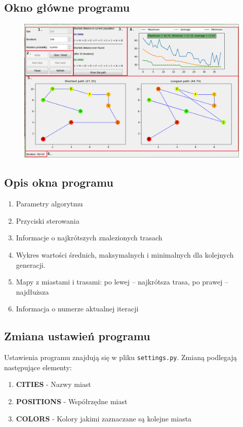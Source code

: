 \documentclass[a4paper,11pt]{article}
\begin{document}
		\subsection{Okno główne programu}
			\begin{figure}[H]
				\centering
				\includegraphics[scale=0.55]{main_window2.png}
			\end{figure}
		
		\subsection{Opis okna programu}
			\begin{enumerate}
				\item Parametry algorytmu
				\item Przyciski sterowania
				\item Informacje o najkrótszych znalezionych trasach
				\item Wykres wartości średnich, maksymalnych i minimalnych dla kolejnych generacji.
				\item Mapy z miastami i trasami: po lewej -- najkrótsza trasa, po prawej -- najdłuższa
				\item Informacja o numerze aktualnej iteracji
			\end{enumerate}
		
		\subsection{Zmiana ustawień programu}
			Ustawienia programu znajdują się w pliku \texttt{settings.py}. Zmianą podlegają następujące elementy:
			\begin{enumerate}
				\item \textbf{CITIES} - Nazwy miast
				\item \textbf{POSITIONS} - Współrzędne miast
				\item \textbf{COLORS} - Kolory jakimi zaznaczane są kolejne miasta
			\end{enumerate}
	
\end{document}
